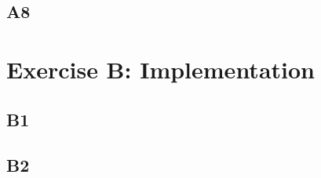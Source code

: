 \documentclass[11pt]{article}
\begin{document}
\subsection*{A8}

\section*{Exercise B: Implementation}
\subsection*{B1}
\subsection*{B2}
\end{document}
